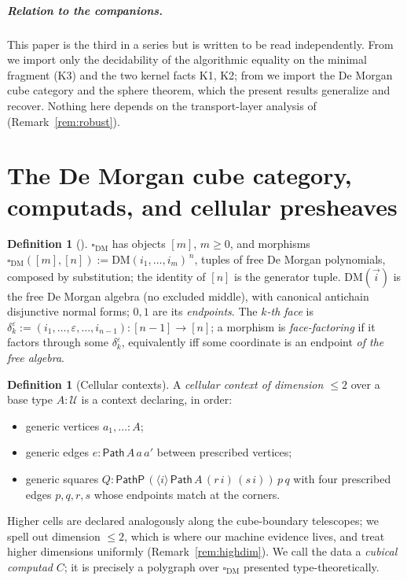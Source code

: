 \documentclass[11pt]{amsart}
\theoremstyle{definition}
\newtheorem{defi}[thm]{Definition}
\newcommand{\DM}[1]{\mathrm{DM}(#1)}
\newcommand{\Dbox}{\square_{\mathrm{DM}}}
\newcommand{\Path}{\mathsf{Path}}
\newcommand{\PathP}{\mathsf{PathP}}
\newcommand{\U}{\mathcal{U}}
\begin{document}
\subparagraph*{Relation to the companions.}  This paper is the
third in a series but is written to be read independently.  From
\cite{Const} we import only the decidability of the algorithmic
equality on the minimal fragment (K3) and the two kernel facts K1,
K2; from \cite{Sphere} we import the De Morgan cube category and
the sphere theorem, which the present results generalize and
recover.  Nothing here depends on the transport-layer analysis of
\cite{Const} (Remark~\ref{rem:robust}).

\section{The De Morgan cube category, computads, and cellular
  presheaves}
\label{sec:cube}

\begin{defi}[{\cite[Def.~2.2]{Sphere}}]\label{def:cube}
  $\Dbox$ has objects $[m]$, $m \ge 0$, and morphisms
  $\Dbox([m],[n]) := \DM{i_1,\dots,i_m}^{\,n}$, tuples of free De
  Morgan polynomials, composed by substitution; the identity of
  $[n]$ is the generator tuple.  $\DM{\vec i}$ is the free De
  Morgan algebra (no excluded middle), with canonical antichain
  disjunctive normal forms; $0, 1$ are its \emph{endpoints}.  The
  \emph{$k$-th face} is $\delta_k^\varepsilon := (i_1, \dots,
  \varepsilon, \dots, i_{n-1}) : [n-1] \to [n]$; a morphism is
  \emph{face-factoring} if it factors through some
  $\delta_k^\varepsilon$, equivalently iff some coordinate is an
  endpoint \emph{of the free algebra}.
\end{defi}

\begin{defi}[Cellular contexts]\label{def:computad}
  A \emph{cellular context of dimension $\le 2$} over a base type
  $A : \U$ is a context declaring, in order:
  \begin{itemize}
  \item generic vertices $a_1, \dots : A$;
  \item generic edges $e : \Path\,A\,a\,a'$ between prescribed
    vertices;
  \item generic squares
    $Q : \PathP\,(\langle i \rangle\,
    \Path\,A\,(r\,i)\,(s\,i))\,p\,q$ with four prescribed edges
    $p, q, r, s$ whose endpoints match at the corners.
  \end{itemize}
  Higher cells are declared analogously along the cube-boundary
  telescopes; we spell out dimension $\le 2$, which is where our
  machine evidence lives, and treat higher dimensions uniformly
  (Remark~\ref{rem:highdim}).  We call the data a \emph{cubical
  computad} $C$; it is precisely a polygraph
  \cite{Burroni,Polygraphs} over $\Dbox$ presented type-theoretically.
\end{defi}
\end{document}
